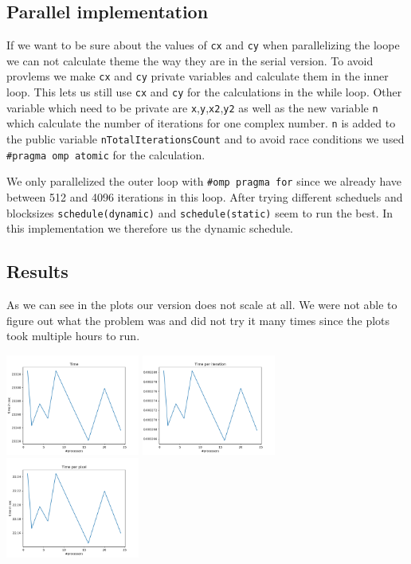 \documentclass[unicode,11pt,a4paper,oneside,numbers=endperiod,openany]{scrartcl}
\begin{document}
\subsection{Parallel implementation}
If we want to be sure about the values of \texttt{cx} and \texttt{cy} when parallelizing the loope we can not calculate theme the way they are in the serial version.
To avoid provlems we make \texttt{cx} and \texttt{cy} private variables and calculate them in the inner loop.
This lets us still use \texttt{cx} and \texttt{cy} for the calculations in the while loop.
Other variable which need to be private are \texttt{x},\texttt{y},\texttt{x2},\texttt{y2} as well as the new variable \texttt{n} which calculate the number of iterations for one complex number.
\texttt{n} is added to the public variable \texttt{nTotalIterationsCount} and to avoid race conditions we used \texttt{\#pragma omp atomic} for the calculation.

We only parallelized the outer loop with \texttt{\#omp pragma for} since we already have between 512 and 4096 iterations in this loop.
After trying different scheduels and blocksizes \texttt{schedule(dynamic)} and \texttt{schedule(static)} seem to run the best.
In this implementation we therefore us the dynamic schedule.

\subsection{Results}

As we can see in the plots our version does not scale at all. We were not able to figure out what the problem was and did not try it many times since the plots took multiple hours to run.

\includegraphics[width=0.33\textwidth]{../results/time.pdf}
\includegraphics[width=0.33\textwidth]{../results/timeperiteration.pdf}
\includegraphics[width=0.33\textwidth]{../results/timeperpixel.pdf}
\end{document}
